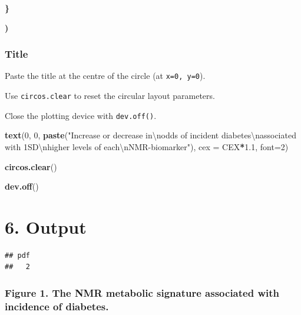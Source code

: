 \documentclass[
]{article}
\newenvironment{Shaded}{\begin{snugshade}}{\end{snugshade}}
\newcommand{\CharTok}[1]{\textcolor[rgb]{0.31,0.60,0.02}{#1}}
\newcommand{\DataTypeTok}[1]{\textcolor[rgb]{0.13,0.29,0.53}{#1}}
\newcommand{\DecValTok}[1]{\textcolor[rgb]{0.00,0.00,0.81}{#1}}
\newcommand{\ErrorTok}[1]{\textcolor[rgb]{0.64,0.00,0.00}{\textbf{#1}}}
\newcommand{\FloatTok}[1]{\textcolor[rgb]{0.00,0.00,0.81}{#1}}
\newcommand{\KeywordTok}[1]{\textcolor[rgb]{0.13,0.29,0.53}{\textbf{#1}}}
\newcommand{\NormalTok}[1]{#1}
\newcommand{\OperatorTok}[1]{\textcolor[rgb]{0.81,0.36,0.00}{\textbf{#1}}}
\newcommand{\StringTok}[1]{\textcolor[rgb]{0.31,0.60,0.02}{#1}}
\begin{document}
\begin{Shaded}
\begin{Highlighting}[]
               
             \ErrorTok{\}}
             
\ErrorTok{)}
\end{Highlighting}
\end{Shaded}

\hypertarget{title}{%
\subsubsection{Title}\label{title}}

Paste the title at the centre of the circle (at \texttt{x=0,\ y=0}).

Use \texttt{circos.clear} to reset the circular layout parameters.

Close the plotting device with \texttt{dev.off()}.

\begin{Shaded}
\begin{Highlighting}[]
\KeywordTok{text}\NormalTok{(}\DecValTok{0}\NormalTok{, }\DecValTok{0}\NormalTok{, }\KeywordTok{paste}\NormalTok{(}\StringTok{"Increase or decrease in}\CharTok{\textbackslash{}n}\StringTok{odds of incident diabetes}\CharTok{\textbackslash{}n}\StringTok{associated with 1SD}\CharTok{\textbackslash{}n}\StringTok{higher levels of each}\CharTok{\textbackslash{}n}\StringTok{NMR-biomarker"}\NormalTok{), }\DataTypeTok{cex =}\NormalTok{ CEX}\OperatorTok{*}\FloatTok{1.1}\NormalTok{, }\DataTypeTok{font=}\DecValTok{2}\NormalTok{)}

\KeywordTok{circos.clear}\NormalTok{()  }

\KeywordTok{dev.off}\NormalTok{()}
\end{Highlighting}
\end{Shaded}

\hypertarget{output}{%
\section{6. Output}\label{output}}

\begin{verbatim}
## pdf 
##   2
\end{verbatim}

\hypertarget{figure-1.-the-nmr-metabolic-signature-associated-with-incidence-of-diabetes.}{%
\subsubsection{Figure 1. The NMR metabolic signature associated with
incidence of
diabetes.}\label{figure-1.-the-nmr-metabolic-signature-associated-with-incidence-of-diabetes.}}
\end{document}
